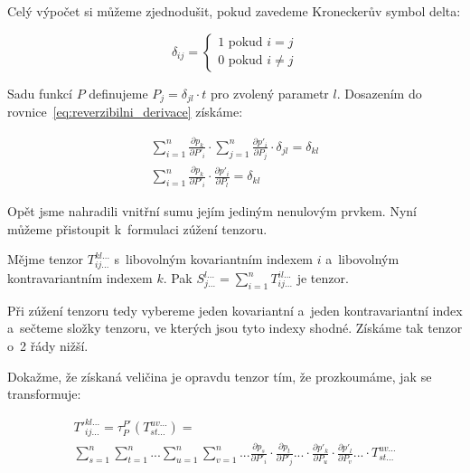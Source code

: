 Celý výpočet si můžeme zjednodušit, pokud zavedeme Kroneckerův symbol delta:

\begin{equation}
\delta_{ij} =
\begin{cases}
	1 \text{ pokud } i = j \\
	0 \text{ pokud } i \neq j
\end{cases}
\end{equation}

Sadu funkcí \(P\) definujeme \(P_j = \delta_{jl} \cdot t\) pro zvolený parametr \(l\). Dosazením do rovnice~\eqref{eq:reverzibilni_derivace} získáme:

\begin{equation}
\label{eq:vztah_mezi_bazemi}
\begin{split}
\sum_{i=1}^n \frac{\partial p_k}{\partial P'_i} \cdot \sum_{j=1}^n \frac{\partial p'_i}{\partial P_j} \cdot \delta_{jl} = \delta_{kl} \\
\sum_{i=1}^n \frac{\partial p_k}{\partial P'_i} \cdot \frac{\partial p'_i}{\partial P_l} = \delta_{kl}
\end{split}
\end{equation}

Opět jsme nahradili vnitřní sumu jejím jediným nenulovým prvkem. Nyní můžeme přistoupit k~formulaci zúžení tenzoru. 

\begin{fact}
Mějme tenzor \(T_{ij...}^{kl...}\) s~libovolným kovariantním indexem \(i\) a~libovolným kontravariantním indexem \(k\). Pak \(S_{j...}^{l...} = \sum_{i=1}^n T_{ij...}^{il...}\) je tenzor.
\end{fact}

Při zúžení tenzoru tedy vybereme jeden kovariantní a~jeden kontravariantní index a~sečteme složky tenzoru, ve kterých jsou tyto indexy shodné. Získáme tak tenzor o~2 řády nižší.

Dokažme, že získaná veličina je opravdu tenzor tím, že prozkoumáme, jak se transformuje:

\begin{equation}
\begin{split}
T'^{kl...}_{ij...} = \tau_P^{P'} (T_{st...}^{uv...}) = \\
\sum_{s=1}^n \sum_{t=1}^n ... \sum_{u=1}^n \sum_{v=1}^n ... \frac{\partial p_s}{\partial P'_i} \cdot \frac{\partial p_t}{\partial P'_j} ... \cdot \frac{\partial p'_k}{\partial P_u} \cdot \frac{\partial p'_l}{\partial P_v} ... \cdot T_{st...}^{uv...}
\end{split}
\end{equation}

